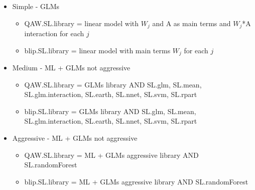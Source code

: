 \documentclass[11pt]{article}\usepackage[]{graphicx}\usepackage[]{color}
\begin{document}
\begin{itemize}
\item Simple - GLMs
\begin{itemize}
\item QAW.SL.library = linear model with $W_j$ and A as main terms and $W_j$*A interaction for each $j$
\item blip.SL.library = linear model with main terms $W_j$ for each $j$
\end{itemize}
\item Medium - ML + GLMs not aggressive
\begin{itemize}
\item QAW.SL.library = GLMs library AND SL.glm, SL.mean, SL.glm.interaction, SL.earth, SL.nnet, SL.svm, SL.rpart
\item blip.SL.library = GLMs library AND SL.glm, SL.mean, SL.glm.interaction, SL.earth, SL.nnet, SL.svm, SL.rpart
\end{itemize}
\item Aggressive - ML + GLMs not aggressive
\begin{itemize}
\item QAW.SL.library = ML + GLMs aggressive library AND SL.randomForest
\item blip.SL.library = ML + GLMs aggressive library AND SL.randomForest
\end{itemize}
\end{itemize}
\end{document}
